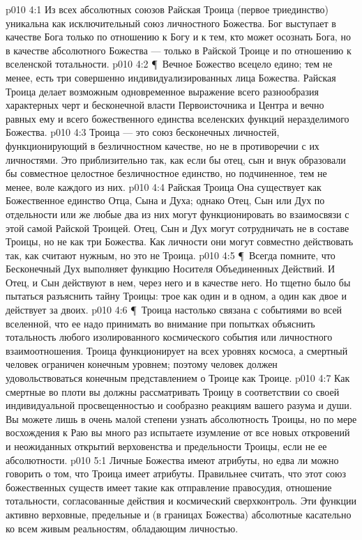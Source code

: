 \vs p010 4:1 Из всех абсолютных союзов Райская Троица (первое триединство) уникальна как исключительный союз личностного Божества. Бог выступает в качестве Бога только по отношению к Богу и к тем, кто может осознать Бога, но в качестве абсолютного Божества --- только в Райской Троице и по отношению к вселенской тотальности.
\vs p010 4:2 \P\ Вечное Божество всецело едино; тем не менее, есть три совершенно индивидуализированных лица Божества. Райская Троица делает возможным одновременное выражение всего разнообразия характерных черт и бесконечной власти Первоисточника и Центра и вечно равных ему и всего божественного единства вселенских функций неразделимого Божества.
\vs p010 4:3 Троица --- это союз бесконечных личностей, функционирующий в безличностном качестве, но не в противоречии с их личностями. Это приблизительно так, как если бы отец, сын и внук образовали бы совместное целостное безличностное единство, но подчиненное, тем не менее, воле каждого из них.
\vs p010 4:4 Райская Троица  Она существует как Божественное единство Отца, Сына и Духа; однако Отец, Сын или Дух по отдельности или же любые два из них могут функционировать во взаимосвязи с этой самой Райской Троицей. Отец, Сын и Дух могут сотрудничать не в составе Троицы, но не как три Божества. Как личности они могут совместно действовать так, как считают нужным, но это не Троица.
\vs p010 4:5 \P\ Всегда помните, что Бесконечный Дух выполняет функцию Носителя Объединенных Действий. И Отец, и Сын действуют в нем, через него и в качестве него. Но тщетно было бы пытаться разъяснить тайну Троицы: трое как один и в одном, а один как двое и действует за двоих.
\vs p010 4:6 \P\ Троица настолько связана с событиями во всей вселенной, что ее надо принимать во внимание при попытках объяснить тотальность любого изолированного космического события или личностного взаимоотношения. Троица функционирует на всех уровнях космоса, а смертный человек ограничен конечным уровнем; поэтому человек должен удовольствоваться конечным представлением о Троице как Троице.
\vs p010 4:7 Как смертные во плоти вы должны рассматривать Троицу в соответствии со своей индивидуальной просвещенностью и сообразно реакциям вашего разума и души. Вы можете лишь в очень малой степени узнать абсолютность Троицы, но по мере восхождения к Раю вы много раз испытаете изумление от все новых откровений и неожиданных открытий верховенства и предельности Троицы, если не ее абсолютности.
\vs p010 5:1 Личные Божества имеют атрибуты, но едва ли можно говорить о том, что Троица имеет атрибуты. Правильнее считать, что этот союз божественных существ имеет такие  как отправление правосудия, отношение тотальности, согласованные действия и космический сверхконтроль. Эти функции активно верховные, предельные и (в границах Божества) абсолютные касательно ко всем живым реальностям, обладающим личностью.
